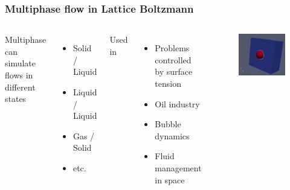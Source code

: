 \documentclass[xcolor=table]{beamer}
\begin{document}
	\begin{frame}
		\frametitle{Multiphase flow in Lattice Boltzmann}
		\begin{columns}
		Multiphase can simulate flows in different states
		\begin{itemize}
			\item Solid / Liquid
			\item Liquid / Liquid
			\item Gas / Solid
			\item etc.
		\end{itemize}
		Used in
		\begin{itemize}
			\item Problems controlled by surface tension
			\item Oil industry
			\item Bubble dynamics
			\item Fluid management in space
		\end{itemize}

		\begin{figure}
			\centering
			\includegraphics[scale=0.2]{Resources/3DCG.png}
		\end{figure}
		\end{columns}
	\end{frame}
\end{document}

